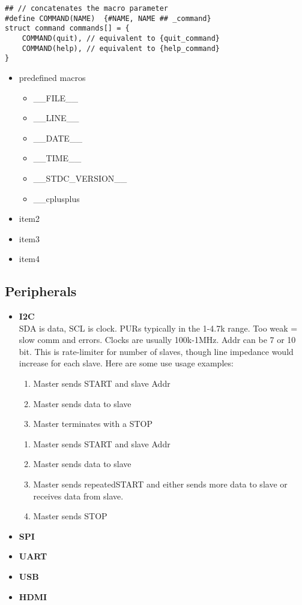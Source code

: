\documentclass{article}
\begin{document}
\begin{lstlisting}[style=cpp]
## // concatenates the macro parameter
#define COMMAND(NAME)  {#NAME, NAME ## _command}
struct command commands[] = {
	COMMAND(quit), // equivalent to {quit_command}
	COMMAND(help), // equivalent to {help_command}
}
\end{lstlisting}

\begin{itemize}
	\item predefined macros
	      \begin{itemize}
		      \item \_\_FILE\_\_
		      \item \_\_LINE\_\_
		      \item \_\_DATE\_\_
		      \item \_\_TIME\_\_
		      \item \_\_STDC\_VERSION\_\_
		      \item \_\_cplusplus
	      \end{itemize}
	\item item2
	\item item3
	\item item4
\end{itemize}

\subsection{Peripherals}
\begin{itemize}
	\item \textbf{I2C}\\
	      SDA is data, SCL is clock. PURs typically in the 1-4.7k range. Too weak = slow comm and errors. Clocks are usually 100k-1MHz. Addr can be 7 or 10 bit. This is rate-limiter for number of slaves, though line impedance would increase for each slave. Here are some use usage examples:
	      \begin{enumerate}
		      \item Master sends START and slave Addr
		      \item Master sends data to slave
		      \item Master terminates with a STOP
	      \end{enumerate}
	      \begin{enumerate}
		      \item Master sends START and slave Addr
		      \item Master sends data to slave
		      \item Master sends repeatedSTART and either sends more data to slave or receives data from slave.
		      \item Master sends STOP
	      \end{enumerate}
	\item \textbf{SPI}\\
	\item \textbf{UART}\\
	\item \textbf{USB}\\
	\item \textbf{HDMI}\\
\end{itemize}
\end{document}
